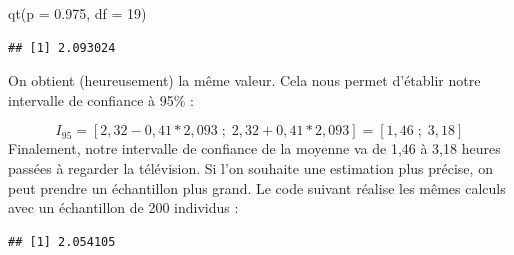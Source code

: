 \documentclass[
  french,
]{book}
\newenvironment{Shaded}{\begin{snugshade}}{\end{snugshade}}
\newcommand{\AttributeTok}[1]{\textcolor[rgb]{0.77,0.63,0.00}{#1}}
\newcommand{\CommentTok}[1]{\textcolor[rgb]{0.56,0.35,0.01}{\textit{#1}}}
\newcommand{\DecValTok}[1]{\textcolor[rgb]{0.00,0.00,0.81}{#1}}
\newcommand{\FloatTok}[1]{\textcolor[rgb]{0.00,0.00,0.81}{#1}}
\newcommand{\FunctionTok}[1]{\textcolor[rgb]{0.00,0.00,0.00}{#1}}
\newcommand{\NormalTok}[1]{#1}
\newcommand{\OtherTok}[1]{\textcolor[rgb]{0.56,0.35,0.01}{#1}}
\newcommand{\SpecialCharTok}[1]{\textcolor[rgb]{0.00,0.00,0.00}{#1}}
\begin{document}
\begin{Shaded}
\begin{Highlighting}[]
\FunctionTok{qt}\NormalTok{(}\AttributeTok{p =} \FloatTok{0.975}\NormalTok{, }\AttributeTok{df =} \DecValTok{19}\NormalTok{)}
\end{Highlighting}
\end{Shaded}

\begin{verbatim}
## [1] 2.093024
\end{verbatim}

On obtient (heureusement) la même valeur. Cela nous permet d'établir notre intervalle de confiance à 95\% :

\[ I_{95} = [2,32-0,41*2,093 \;;\;  2,32 + 0,41*2,093] = [1,46 \;;\; 3,18] \]
Finalement, notre intervalle de confiance de la moyenne va de 1,46 à 3,18 heures passées à regarder la télévision. Si l'on souhaite une estimation plus précise, on peut prendre un échantillon plus grand. Le code suivant réalise les mêmes calculs avec un échantillon de 200 individus :

\begin{Shaded}
\end{Shaded}

\begin{verbatim}
## [1] 2.054105
\end{verbatim}

\begin{Shaded}
\end{Shaded}
\end{document}

